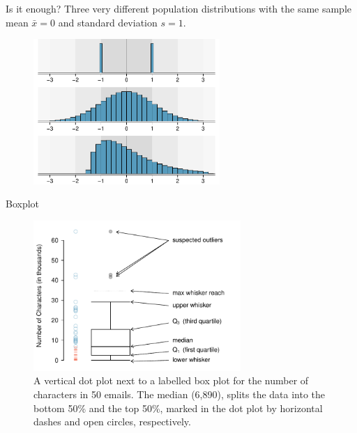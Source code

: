 \documentclass[12pt,a4paper]{beamer}
\begin{document}
\begin{frame}{Is it enough?}
	Three very different population distributions with the same sample mean $\bar{x}=0$ and standard deviation $s=1$.
	\begin{figure}
	\centering
	\includegraphics[width=0.63\textwidth]{figures/severalDiffDistWithSdOf1/severalDiffDistWithSdOf1}
	\label{severalDiffDistWithSdOf1}
	\end{figure}
\end{frame}
\begin{frame}{Boxplot}

	\begin{figure}[h]
	   \centering
\includegraphics[width=0.7\textwidth]{figures/boxPlotLayoutNumVar/boxPlotLayoutNumVar}
\small\caption{A vertical dot plot next to a labelled box plot for the number of characters in 50 emails. The median (6,890), splits the data into the bottom 50\% and the top 50\%, marked in the dot plot by horizontal dashes and open circles, respectively.}
\end{figure}
\end{frame}
\end{document}
